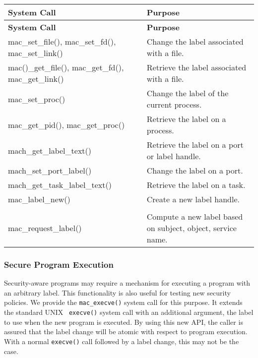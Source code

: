 \begin{longtable}{|p{1.5in}|p{3in}|}
\hline
{\bf System Call} & {\bf Purpose} \\
\hline
\hline
\endfirsthead
\hline
{\bf System Call} & {\bf Purpose} \\
\hline
\hline
\endhead
\hline
\endfoot
mac\_set\_file(), mac\_set\_fd(), mac\_set\_link() & Change the label associated with a file. \\[3mm]
\hline
mac()\_get\_file(), mac\_get\_fd(), mac\_get\_link() & Retrieve the label associated with a file. \\[3mm]
\hline
mac\_set\_proc() & Change the label of the current process. \\[3mm]
\hline
mac\_get\_pid(), mac\_get\_proc() & Retrieve the label on a process. \\[3mm]
\hline
mach\_get\_label\_text() & Retrieve the label on a port or label handle. \\[3mm]
\hline
mach\_set\_port\_label() & Change the label on a port. \\[3mm]
\hline
mach\_get\_task\_label\_text() & Retrieve the label on a task. \\[3mm]
\hline
mac\_label\_new() & Create a new label handle. \\\\[3mm]
\hline
mac\_request\_label() & Compute a new label based on subject, object, service name. \\
\end{longtable}

\subsubsection{Secure Program Execution}
Security-aware programs may require a mechanism for executing a
program with an arbitrary label.  This functionality is also useful
for testing new security policies.  We provide the {\tt mac\_execve()}
system call for this purpose. It extends the standard UNIX {\tt
execve()} system call with an additional argument, the label to use
when the new program is executed.  By using this new API, the caller
is assured that the label change will be atomic with respect to
program execution.  With a normal {\tt execve()} call followed by
a label change, this may not be the case.

